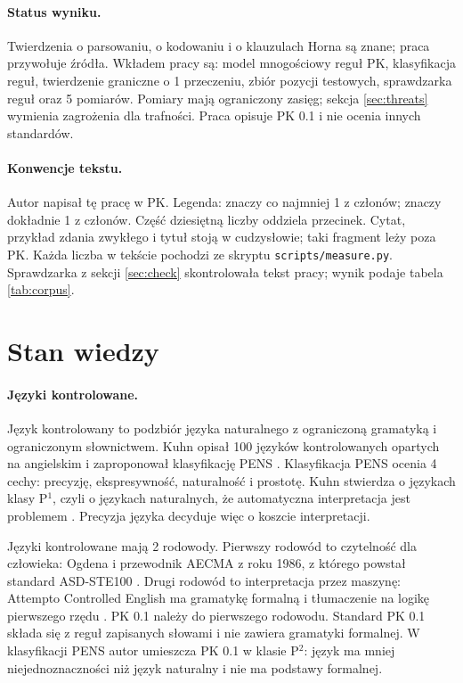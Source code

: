 \paragraph{Status wyniku.}
Twierdzenia o parsowaniu, o kodowaniu i o klauzulach Horna są znane; praca przywołuje
źródła. Wkładem pracy są: model mnogościowy reguł PK, klasyfikacja \pkRules{} reguł,
twierdzenie graniczne o 1 przeczeniu, zbiór \pkItems{} pozycji testowych, sprawdzarka reguł
oraz 5 pomiarów. Pomiary mają ograniczony zasięg; sekcja \ref{sec:threats} wymienia
zagrożenia dla trafności. Praca opisuje PK 0.1 i nie ocenia innych standardów.

\paragraph{Konwencje tekstu.}
Autor napisał tę pracę w PK. Legenda:  znaczy co najmniej 1 z członów;
 znaczy dokładnie 1 z członów. Część dziesiętną liczby oddziela przecinek.
Cytat, przykład zdania zwykłego i tytuł stoją w cudzysłowie; taki fragment leży poza PK.
Każda liczba w tekście pochodzi ze skryptu \texttt{scripts/measure.py}. Sprawdzarka
z sekcji \ref{sec:check} skontrolowała tekst pracy; wynik podaje tabela \ref{tab:corpus}.

\section{Stan wiedzy}
\label{sec:related}

\paragraph{Języki kontrolowane.}
Język kontrolowany to podzbiór języka naturalnego z ograniczoną gramatyką i ograniczonym
słownictwem. Kuhn opisał 100 języków kontrolowanych opartych na angielskim i zaproponował
klasyfikację PENS \cite{kuhn2014}. Klasyfikacja PENS ocenia 4 cechy: precyzję,
ekspresywność, naturalność i prostotę. Kuhn stwierdza o językach klasy P$^1$, czyli
o językach naturalnych, że automatyczna interpretacja jest problemem .
Precyzja języka decyduje więc o koszcie interpretacji.

Języki kontrolowane mają 2 rodowody. Pierwszy rodowód to czytelność dla człowieka:
 Ogdena \cite{ogden1930} i przewodnik AECMA z roku 1986, z którego
powstał standard ASD-STE100 \cite{ste}. Drugi rodowód to interpretacja przez maszynę:
Attempto Controlled English ma gramatykę formalną i tłumaczenie na logikę pierwszego rzędu
\cite{fuchs2008}. PK 0.1 należy do pierwszego rodowodu. Standard PK 0.1 składa się z reguł
zapisanych słowami i nie zawiera gramatyki formalnej. W klasyfikacji PENS autor umieszcza
PK 0.1 w klasie P$^2$: język ma mniej niejednoznaczności niż język naturalny i nie ma
podstawy formalnej.

